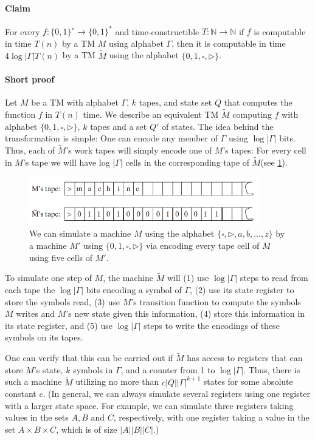 \documentclass[a4paper,12pt]{article}
\begin{document}
\paragraph{Claim}

For every $f : \{0, 1\}^{∗} \rightarrow \{0, 1\}^{*}$ and time-constructible $T :  \mathbb{N} →  \mathbb{N}$ if $f$ is
computable in time $T(n)$ by a TM $M$ using alphabet $\Gamma$, then it is computable in time $4 \log{|\Gamma|}T(n)$ by a TM $\widetilde{M}$ using the alphabet $\{0, 1, \square, \rhd \}$.

\paragraph{Short proof}

Let $M$ be a TM with alphabet $\Gamma$, $k$ tapes, and state set $Q$ that computes
the function $f$ in $T(n)$ time. We describe an equivalent TM $\widetilde{M}$ computing $f$ with alphabet $\{0, 1, \square, \rhd \}$, $k$ tapes and a set $Q'$ of states. The idea behind the transformation is simple:
One can encode any member of $\Gamma$ using $\log |\Gamma|$ bits. Thus, each of $\widetilde{M}$'s work tapes will
simply encode one of $M$’s tapes: For every cell in $M$'s tape we will have log |$\Gamma$| cells in
the corresponding tape of $\widetilde{M}$(see \ref{fig:scetch1}).

\begin{figure}[!ht]
\centering
\includegraphics[width=10cm]{scetch1.png}
\caption{We can simulate a machine $M$ using the alphabet $\{\square, \rhd, a, b, ..., z \}$ by a machine $M'$ using $\{0, 1, \square, \rhd \}$ via encoding every tape cell of $M$ using five cells of $M'$.}
\label{fig:scetch1}
\end{figure}

\par	
To simulate one step of $M$, the machine $\widetilde{M}$ will (1) use $\log |\Gamma|$ steps to read from
each tape the $\log |\Gamma|$ bits encoding a symbol of $\Gamma$, (2) use its state register to store the
symbols read, (3) use $M$’s transition function to compute the symbols $M$ writes and $M$'s
new state given this information, (4) store this information in its state register, and (5)
use $\log |\Gamma|$ steps to write the encodings of these symbols on its tapes.
\par 
One can verify that this can be carried out if $\widetilde{M}$ has access to registers that can
store $M$'s state, $k$ symbols in $\Gamma$, and a counter from 1 to $\log |\Gamma|$. Thus, there is such a
machine $\widetilde{M}$ utilizing no more than $c|Q||\Gamma|^{k+1}$ states for some absolute constant $c$. (In
general, we can always simulate several registers using one register with a larger state
space. For example, we can simulate three registers taking values in the sets $A, B \text{ and } C$, respectively, with one register taking a value in the set $A \times B \times C$, which is of size $|A| |B| |C|$.)
\end{document}
